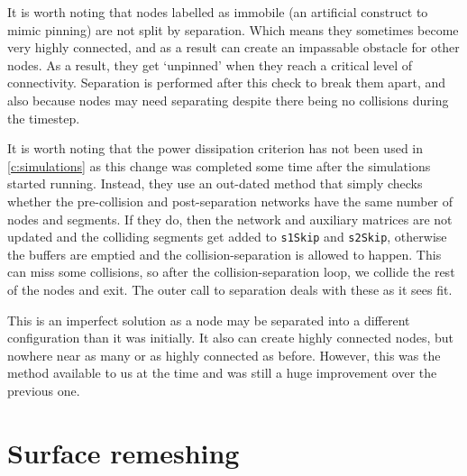 It is worth noting that nodes labelled as immobile (an artificial construct to mimic pinning) are not split by separation. Which means they sometimes become very highly connected, and as a result can create an impassable obstacle for other nodes. As a result, they get `unpinned' when they reach a critical level of connectivity. Separation is performed after this check to break them apart, and also because nodes may need separating despite there being no collisions during the timestep.

It is worth noting that the power dissipation criterion has not been used in \cref{c:simulations} as this change was completed some time after the simulations started running. Instead, they use an out-dated method that simply checks whether the pre-collision and post-separation networks have the same number of nodes and segments. If they do, then the network and auxiliary matrices are not updated and the colliding segments get added to \texttt{s1Skip} and \texttt{s2Skip}, otherwise the buffers are emptied and the collision-separation is allowed to happen. This can miss some collisions, so after the collision-separation loop, we collide the rest of the nodes and exit. The outer call to separation deals with these as it sees fit.

This is an imperfect solution as a node may be separated into a different configuration than it was initially. It also can create highly connected nodes, but nowhere near as many or as highly connected as before. However, this was the method available to us at the time and was still a huge improvement over the previous one.

\section{Surface remeshing}

